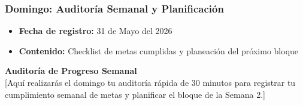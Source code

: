 \documentclass[11pt, a4paper]{article}
\begin{document}
\subsubsection{Domingo: Auditoría Semanal y Planificación}
\begin{itemize}
  \item[] \textbf{Fecha de registro:} 31 de Mayo del 2026
  \item[] \textbf{Contenido:} Checklist de metas cumplidas y planeación del próximo bloque
\end{itemize}

\noindent\textbf{Auditoría de Progreso Semanal}\\[0.5em]
[Aquí realizarás el domingo tu auditoría rápida de 30 minutos para registrar tu cumplimiento semanal de metas y planificar el bloque de la Semana 2.]

\newpage
\end{document}
